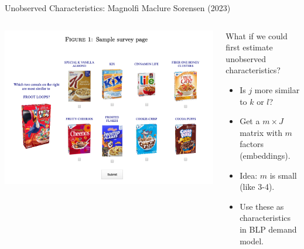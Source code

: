 \documentclass[aspectratio=169,10pt]{beamer}
\begin{document}
\begin{frame}{Unobserved Characteristics: Magnolfi Maclure Sorensen (2023)}
\begin{columns}
\begin{column}{0.5\textwidth}
     \includegraphics[width=\textwidth]{resources/embeddings_1}      
\end{column}
\begin{column}{0.5\textwidth}
What if we could first estimate \alert{unobserved characteristics}?
\begin{itemize}
\item Is $j$ more similar to $k$ or $l$?
\item Get a $m \times J$ matrix with $m$ factors (embeddings).
\item Idea: $m$ is small (like 3-4).
\item Use these as characteristics in BLP demand model.
\end{itemize}
\end{column}
\end{columns}
\end{frame}
\end{document}
